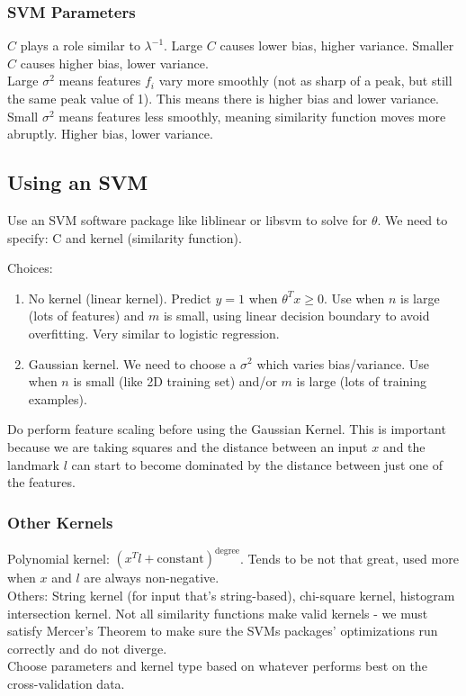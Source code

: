 \documentclass[11pt,letterpaper]{article}
\begin{document}
\subsubsection{SVM Parameters}
$C$ plays a role similar to $\lambda^{-1}$. Large $C$ causes lower bias, higher variance. Smaller $C$ causes higher bias, lower variance.\\
Large $\sigma^2$ means features $f_i$ vary more smoothly (not as sharp of a peak, but still the same peak value of 1). This means there is higher bias and lower variance. Small $\sigma^2$ means features less smoothly, meaning similarity function moves more abruptly. Higher bias, lower variance.

\subsection{Using an SVM}
Use an SVM software package like liblinear or libsvm to solve for $\theta$. We need to specify: C and kernel (similarity function).

Choices:
\begin{enumerate}
	\item No kernel (linear kernel). Predict $y = 1$ when $\theta^Tx \geq 0$. Use when $n$ is large (lots of features) and $m$ is small, using linear decision boundary to avoid overfitting. Very similar to logistic regression.
	\item Gaussian kernel. We need to choose a $\sigma^2$ which varies bias/variance. Use when $n$ is small (like 2D training set) and/or $m$ is large (lots of training examples).
\end{enumerate}
Do perform feature scaling before using the Gaussian Kernel. This is important because we are taking squares and the distance between an input $x$ and the landmark $l$ can start to become dominated by the distance between just one of the features.

\subsubsection{Other Kernels}
Polynomial kernel: $(x^Tl + \textrm{constant})^{\textrm{degree}}$. Tends to be not that great, used more when $x$ and $l$ are always non-negative.\\
Others: String kernel (for input that's string-based), chi-square kernel, histogram intersection kernel. Not all similarity functions make valid kernels - we must satisfy Mercer's Theorem to make sure the SVMs packages' optimizations run correctly and do not diverge.\\
Choose parameters and kernel type based on whatever performs best on the cross-validation data.
\end{document}
